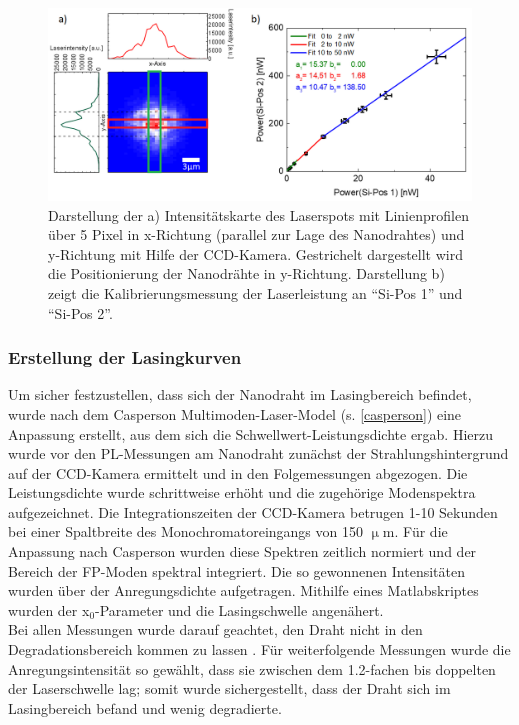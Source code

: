 \begin{figure}
\centering
\includegraphics[width=1\textwidth]{Bilder/Methodik/spotsize}
\caption{Darstellung der a) Intensitätskarte des Laserspots mit Linienprofilen über 5 Pixel in x-Richtung (parallel zur Lage des Nanodrahtes) und y-Richtung mit Hilfe der CCD-Kamera. Gestrichelt dargestellt wird die Positionierung der Nanodrähte in y-Richtung. Darstellung b) zeigt die Kalibrierungsmessung der Laserleistung an ``Si-Pos 1'' und ``Si-Pos 2''.}
\label{laserspot}
\end{figure}
\subsubsection{Erstellung der Lasingkurven}
Um sicher festzustellen, dass sich der Nanodraht im Lasingbereich befindet, wurde nach dem Casperson Multimoden-Laser-Model (s. \autoref{casperson}) eine Anpassung erstellt, aus dem sich die Schwellwert-Leistungsdichte ergab. Hierzu wurde vor den PL-Messungen am Nanodraht zunächst der Strahlungshintergrund auf der CCD-Kamera ermittelt und in den Folgemessungen abgezogen. Die Leistungsdichte wurde schrittweise erhöht und die zugehörige Modenspektra aufgezeichnet. Die Integrationszeiten der CCD-Kamera betrugen 1-10 Sekunden bei einer Spaltbreite des Monochromatoreingangs von 150 $\upmu$m. Für die Anpassung nach Casperson wurden diese Spektren zeitlich normiert und der Bereich der FP-Moden spektral integriert. Die so gewonnenen Intensitäten wurden über der Anregungsdichte aufgetragen. Mithilfe eines Matlabskriptes wurden der x$_\text{0}$-Parameter und die Lasingschwelle angenähert.\\
Bei allen Messungen wurde darauf geachtet, den Draht nicht in den Degradationsbereich kommen zu lassen \cite{Zapf.2017}. Für weiterfolgende Messungen wurde die Anregungsintensität so gewählt, dass sie zwischen dem 1.2-fachen bis doppelten der Laserschwelle lag; somit wurde sichergestellt, dass der Draht sich im Lasingbereich befand und wenig degradierte. 
